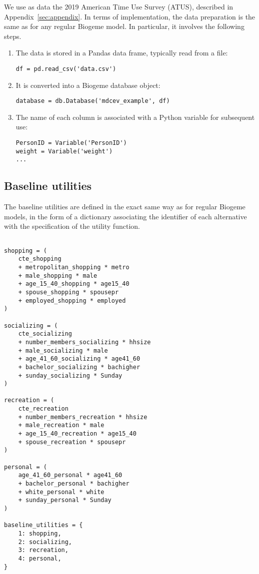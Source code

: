 \documentclass[12pt,a4paper]{article}
\begin{document}
We use as data the 2019 American Time Use Survey (ATUS), described in Appendix~\ref{sec:appendix}. In terms of implementation, the data preparation is the same as for any regular Biogeme model. In particular,
it involves the following steps.
\begin{enumerate}
    \item The data is stored in a Pandas data frame, typically read from a file:
\begin{lstlisting}
df = pd.read_csv('data.csv')
\end{lstlisting}
\item It is converted into a Biogeme database object:
\begin{lstlisting}
database = db.Database('mdcev_example', df)
\end{lstlisting}
\item The name of each column is associated with a Python variable for subsequent use:
\begin{lstlisting}
PersonID = Variable('PersonID')
weight = Variable('weight')
...
\end{lstlisting}
\end{enumerate}

\subsection{Baseline utilities}

The baseline utilities are defined in the exact same way as for regular Biogeme models, in the form of a dictionary associating
the identifier of each alternative with the specification of the utility function.

\begin{lstlisting}

shopping = (
    cte_shopping
    + metropolitan_shopping * metro
    + male_shopping * male
    + age_15_40_shopping * age15_40
    + spouse_shopping * spousepr
    + employed_shopping * employed
)

socializing = (
    cte_socializing
    + number_members_socializing * hhsize
    + male_socializing * male
    + age_41_60_socializing * age41_60
    + bachelor_socializing * bachigher
    + sunday_socializing * Sunday
)

recreation = (
    cte_recreation
    + number_members_recreation * hhsize
    + male_recreation * male
    + age_15_40_recreation * age15_40
    + spouse_recreation * spousepr
)

personal = (
    age_41_60_personal * age41_60
    + bachelor_personal * bachigher
    + white_personal * white
    + sunday_personal * Sunday
)

baseline_utilities = {
    1: shopping,
    2: socializing,
    3: recreation,
    4: personal,
}
\end{lstlisting}
\end{document}
